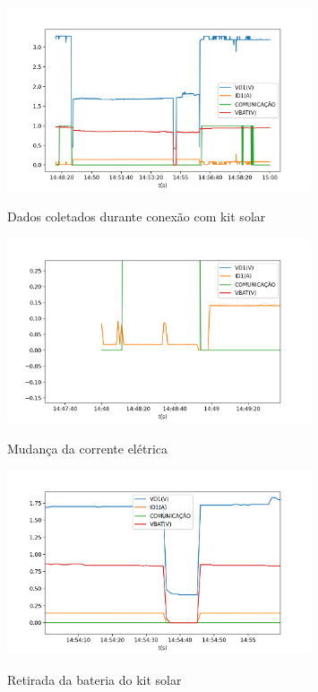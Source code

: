 \documentclass[11pt,a4paper]{article}
\begin{document}
\begin{figure}[hbt]
	\centering
		\caption{Dados coletados durante conexão com kit solar}
		\includegraphics[width=0.8\textwidth]{gsolar.png} 
		\label{fig:dadoskit} 
\end{figure} 
 
\begin{figure}[hbt]
	\centering
		\caption{Mudança da corrente elétrica}
		\includegraphics[width=0.8\textwidth]{gsolarID1.png} 
		\label{fig:id1} 
\end{figure} 

\begin{figure}[hbt]
	\centering
		\caption{Retirada da bateria do kit solar}
		\includegraphics[width=0.8\textwidth]{gsolarVBAT.png} 
		\label{fig:VBAT} 
\end{figure}
\end{document}
